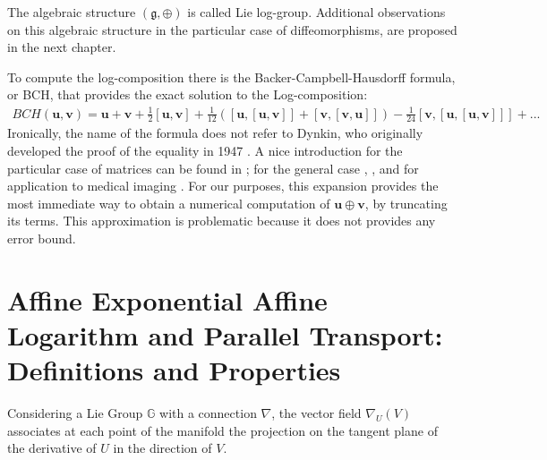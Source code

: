 \noindent
The algebraic structure $(\mathfrak{g} , \oplus)$ is called Lie log-group. Additional observations on this algebraic structure in the particular case of diffeomorphisms, are proposed in the next chapter.

To compute the log-composition there is the Backer-Campbell-Hausdorff formula, or BCH,
that provides the exact solution to the Log-composition: 
\begin{align*}
BCH(\mathbf{u},\mathbf{v}) 
= 
\mathbf{u} + \mathbf{v} + \frac{1}{2}[\mathbf{u},\mathbf{v}] + \frac{1}{12}([\mathbf{u},[\mathbf{u},\mathbf{v}]]
+ [\mathbf{v},[\mathbf{v},\mathbf{u}]]) - \frac{1}{24}[\mathbf{v},[\mathbf{u},[\mathbf{u},\mathbf{v}]]] +... 
\end{align*}
Ironically, the name of the formula does not refer to Dynkin, who originally developed the proof of the equality in 1947 \cite{dynkin1947calculation}. A nice introduction for the particular case of matrices can be found in \cite{hall2015lie}; for the general case \cite{klarsfeld1989baker}, \cite{serre2009lie}, and for application to medical imaging \cite{vercauteren08}.
For our purposes, this expansion provides the most immediate way to obtain a numerical computation of $\mathbf{u}\oplus \mathbf{v}$, by truncating its terms. This approximation is problematic because it does not provides any error bound.

\section{Affine Exponential Affine Logarithm and Parallel Transport: Definitions and Properties}

Considering a Lie Group $\mathbb{G}$ with a connection $\nabla$, the vector field $\nabla_{U}(V)$ associates at each point of the manifold the projection on the tangent plane of the derivative of $U$ in the direction of $V$. 

